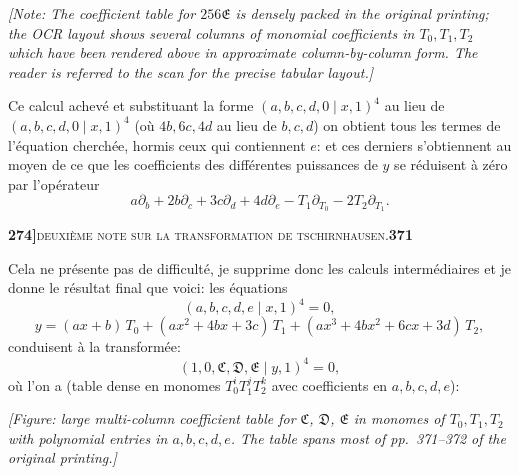 \documentclass[11pt]{article}
\newcommand{\Cdel}{\mid}
\begin{document}
\noindent \textit{[Note: The coefficient table for $256\mathfrak{E}$ is densely packed in the original printing; the OCR layout shows several columns of monomial coefficients in $T_0,T_1,T_2$ which have been rendered above in approximate column-by-column form. The reader is referred to the scan for the precise tabular layout.]}

\medskip

Ce calcul achev\'e et substituant la forme $(a, b, c, d, 0 \Cdel x, 1)^4$ au lieu de $(a, b, c, d, 0 \Cdel x, 1)^4$ (o\`u $4 b, 6 c, 4 d$ au lieu de $b, c, d$) on obtient tous les termes de l'\'equation cherch\'ee, hormis ceux qui contiennent $e$: et ces derniers s'obtiennent au moyen de ce que les coefficients des diff\'erentes puissances de $y$ se r\'eduisent \`a z\'ero par l'op\'erateur
\[
a \partial_b + 2 b \partial_c + 3 c \partial_d + 4 d \partial_e - T_1 \partial_{T_0} - 2 T_2 \partial_{T_1}.
\]

\newpage
\noindent\textbf{274]}\hfill\textsc{deuxi\`eme note sur la transformation de tschirnhausen.}\hfill\textbf{371}

\medskip

\noindent Cela ne pr\'esente pas de difficult\'e, je supprime donc les calculs interm\'ediaires et je donne le r\'esultat final que voici: les \'equations
\[
(a, b, c, d, e \Cdel x, 1)^4 = 0,
\]
\[
y = (a x + b)\, T_0 + (a x^2 + 4 b x + 3 c)\, T_1 + (a x^3 + 4 b x^2 + 6 c x + 3 d)\, T_2,
\]
conduisent \`a la transform\'ee:
\[
(1, 0, \mathfrak{C}, \mathfrak{D}, \mathfrak{E} \Cdel y, 1)^4 = 0,
\]
o\`u l'on a (table dense en monomes $T_0^i T_1^j T_2^k$ avec coefficients en $a, b, c, d, e$):

\medskip

\textit{[Figure: large multi-column coefficient table for $\mathfrak{C}$, $\mathfrak{D}$, $\mathfrak{E}$ in monomes of $T_0, T_1, T_2$ with polynomial entries in $a, b, c, d, e$. The table spans most of pp.~371--372 of the original printing.]}

\medskip
\end{document}
